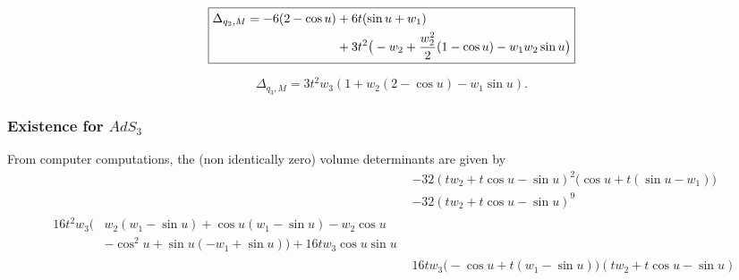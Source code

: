 \begin{equation}
	\boxed{%
		\begin{aligned}
			\Delta_{q_2,M}=-6(2-\cos u) & +6t(\sin u+w_1) \\&+3t^2\big(
			-w_2+\frac{w_2^2}{2}(1-\cos u)-w_1w_2\sin u
			\big)
		\end{aligned}
	}
\end{equation}

\begin{equation}
	\boxed
	{
		\Delta_{q_3,M}=3t^2w_3(1+w_2(2-\cos u)-w_1\sin u).
	}
\end{equation}

\subsubsection{Existence for \texorpdfstring{$AdS_3$}{AdS3}}

From computer computations, the (non identically zero) volume determinants are given by
\begin{subequations}
	\begin{align}
		 & -32(tw_2+t\cos u-\sin u)^2\big(\cos u+t(\sin u-w_1)\big) \\
		 & -32(tw_2+t\cos u-\sin u)^9                               \\
		\begin{split}
			16t^2w_3\Big(&w_2(w_1-\sin u)+\cos u(w_1-\sin u)-w_2\cos u\\
			&-\cos^2u+\sin u(-w_1+\sin u)
			\Big)+16tw_3\cos u\sin u
		\end{split}   \\
		 & 16tw_3
		\big(
		-\cos u+t(w_1-\sin u)
		\big)
		(tw_2+t\cos u-\sin u)
	\end{align}
\end{subequations}


